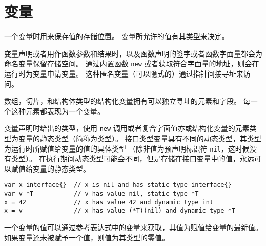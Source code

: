 
\chapter{变量}
一个变量时用来保存值的存储位置。
变量所允许的值有其类型来决定。

变量声明或者用作函数参数和结果时，以及函数声明的签字或者函数字面量都会为命名变量保留存储空间。
通过内置函数 \lstinline|new| 或者获取符合字面量的地址，则会在运行时为变量申请变量。
这种匿名变量（可以隐式的）通过指针间接寻址来访问。%

数组，切片，和结构体类型的结构化变量拥有可以独立寻址的元素和字段。
每一个这种元素都表现为一个变量。 

变量声明时给出的类型，使用 \lstinline|new| 调用或者复合字面值亦或结构化变量的元素类型为变量的静态类型（简称为类型）。
接口类型变量具有不同的动态类型，其类型为运行时所赋值给变量的值的具体类型
（除非值为预声明标识符 \lstinline|nil|，这时候没有类型）。
在执行期间动态类型可能会不同，但是存储在接口变量中的值，永远可以赋值给变量的静态类型。
\begin{lstlisting}[style=golang]
var x interface{}  // x is nil and has static type interface{}
var v *T           // v has value nil, static type *T
x = 42             // x has value 42 and dynamic type int
x = v              // x has value (*T)(nil) and dynamic type *T
\end{lstlisting}
一个变量的值可以通过参考表达式中的变量来获取，其值为赋值给变量的最新值。
如果变量还未被赋予一个值，则值为其类型的零值。